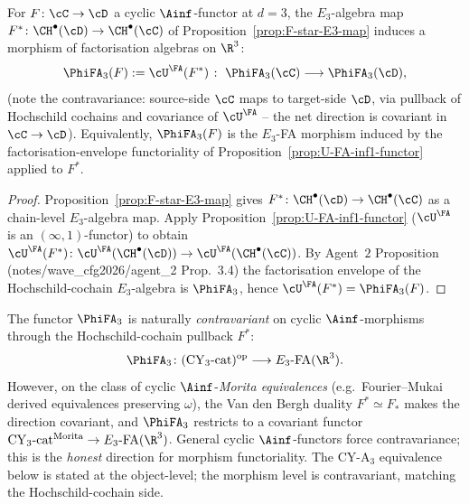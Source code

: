 \begin{corollary}
\label{cor:F-star-lifts-to-FA}
\ClaimStatusProvedHere
For $F \colon \cC \to \cD$ a cyclic $\Ainf$-functor at $d = 3$, the
$E_3$-algebra map $F^* \colon \CH^\bullet(\cD) \to \CH^\bullet(\cC)$
of Proposition~\ref{prop:F-star-E3-map} induces a morphism of
factorisation algebras on $\R^3$:
\[
  \PhiFA_3(F) := \cU^\FA(F^*)
  \;\colon\;
  \PhiFA_3(\cC) \longrightarrow \PhiFA_3(\cD),
\]
(note the contravariance: source-side $\cC$ maps to target-side $\cD$,
via pullback of Hochschild cochains and covariance of $\cU^\FA$ -- the
net direction is covariant in $\cC \to \cD$).
Equivalently, $\PhiFA_3(F)$ is the $E_3$-FA morphism
induced by the factorisation-envelope functoriality of
Proposition~\ref{prop:U-FA-inf1-functor} applied to $F^*$.
\end{corollary}

\begin{proof}
Proposition~\ref{prop:F-star-E3-map} gives
$F^* \colon \CH^\bullet(\cD) \to \CH^\bullet(\cC)$ as a chain-level
$E_3$-algebra map.  Apply Proposition~\ref{prop:U-FA-inf1-functor}
($\cU^\FA$ is an $(\infty,1)$-functor) to obtain
$\cU^\FA(F^*) \colon \cU^\FA(\CH^\bullet(\cD)) \to
\cU^\FA(\CH^\bullet(\cC))$.  By Agent~$2$ Proposition
(notes/wave\_cfg2026/agent\_2 Prop.\ 3.4) the factorisation envelope of
the Hochschild-cochain $E_3$-algebra is $\PhiFA_3$, hence
$\cU^\FA(F^*) = \PhiFA_3(F)$.
\end{proof}

\begin{remark}
\label{rem:contravariance-phi-fa-3}
The functor $\PhiFA_3$ is naturally \emph{contravariant} on cyclic
$\Ainf$-morphisms through the Hochschild-cochain pullback $F^*$:
\[
  \PhiFA_3 \colon (\mathrm{CY}_3\text{-cat})^{\mathrm{op}}
  \longrightarrow E_3\text{-FA}(\R^3).
\]
However, on the class of cyclic $\Ainf$-\emph{Morita equivalences}
(e.g.\ Fourier--Mukai derived equivalences preserving $\omega$), the
Van den Bergh duality $F^* \simeq F_*$ makes the direction covariant,
and $\PhiFA_3$ restricts to a covariant functor
$\mathrm{CY}_3\text{-cat}^{\mathrm{Morita}} \to E_3\text{-FA}(\R^3)$.
General cyclic $\Ainf$-functors force contravariance; this is the
\emph{honest} direction for morphism functoriality.  The CY-A$_3$
equivalence below is stated at the object-level; the morphism level
is contravariant, matching the Hochschild-cochain side.
\end{remark}

